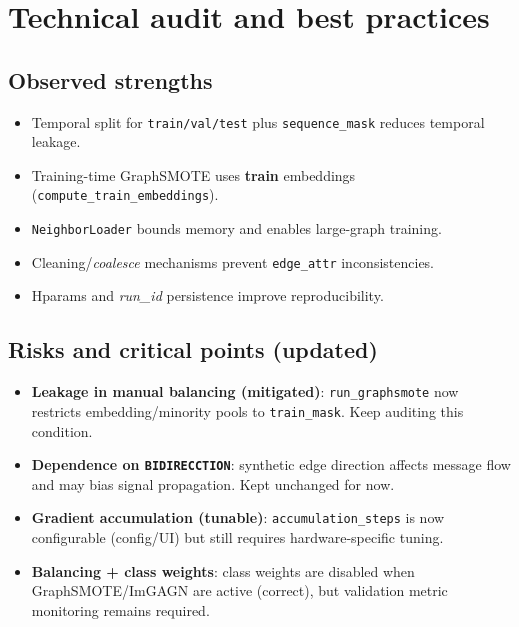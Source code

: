 \section{Technical audit and best practices}
\subsection{Observed strengths}
\begin{itemize}[leftmargin=*]
  \item Temporal split for \texttt{train/val/test} plus \texttt{sequence\_mask} reduces temporal leakage.
  \item Training-time GraphSMOTE uses \textbf{train} embeddings (\texttt{compute\_train\_embeddings}).
  \item \texttt{NeighborLoader} bounds memory and enables large-graph training.
  \item Cleaning/\emph{coalesce} mechanisms prevent \texttt{edge\_attr} inconsistencies.
  \item Hparams and \emph{run\_id} persistence improve reproducibility.
\end{itemize}

\subsection{Risks and critical points (updated)}
\begin{itemize}[leftmargin=*]
  \item \textbf{Leakage in manual balancing (mitigated)}: \texttt{run\_graphsmote} now restricts embedding/minority pools to \texttt{train\_mask}. Keep auditing this condition.
  \item \textbf{Dependence on \texttt{BIDIRECCTION}}: synthetic edge direction affects message flow and may bias signal propagation. Kept unchanged for now.
  \item \textbf{Gradient accumulation (tunable)}: \texttt{accumulation\_steps} is now configurable (config/UI) but still requires hardware-specific tuning.
  \item \textbf{Balancing + class weights}: class weights are disabled when GraphSMOTE/ImGAGN are active (correct), but validation metric monitoring remains required.
\end{itemize}

